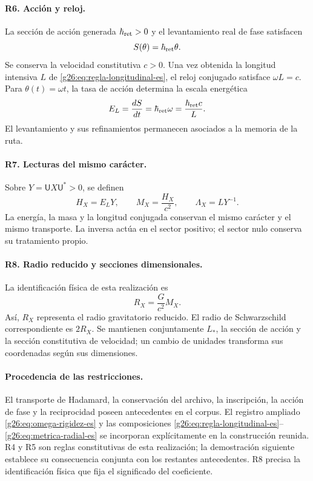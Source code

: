 \paragraph{R6. Acción y reloj.}
La sección de acción generada \(\hbar_{\rm ret}>0\) y el levantamiento
real de fase satisfacen
\begin{equation}
 S(\theta)=\hbar_{\rm ret}\theta.
 \label{g26:eq:accion-fase-es}
\end{equation}
Se conserva la velocidad constitutiva \(c>0\). Una vez obtenida la
longitud intensiva \(L\) de \eqref{g26:eq:regla-longitudinal-es}, el reloj
conjugado satisface \(\omega L=c\). Para \(\theta(t)=\omega t\),
la tasa de acción determina la escala energética
\begin{equation}
 E_{L}=\frac{dS}{dt}=\hbar_{\rm ret}\omega
   =\frac{\hbar_{\rm ret}c}{L}.
 \label{g26:eq:escala-energetica-es}
\end{equation}
El levantamiento y sus refinamientos permanecen asociados a la memoria
de la ruta.

\paragraph{R7. Lecturas del mismo carácter.}
Sobre \(Y=\mathsf U X\mathsf U^*>0\), se definen
\begin{equation}
 H_X=E_{L}Y,\qquad M_X=\frac{H_X}{c^2},\qquad
 \Lambda_X=LY^{-1}.
 \label{g26:eq:lecturas-conjugadas-es}
\end{equation}
La energía, la masa y la longitud conjugada conservan el mismo carácter
y el mismo transporte. La inversa actúa en el sector positivo; el sector
nulo conserva su tratamiento propio.

\paragraph{R8. Radio reducido y secciones dimensionales.}
La identificación física de esta realización es
\begin{equation}
 R_X=\frac{G}{c^2}M_X.
 \label{g26:eq:radio-reducido-es}
\end{equation}
Así, \(R_X\) representa el radio gravitatorio reducido. El radio de
Schwarzschild correspondiente es \(2R_X\). Se mantienen conjuntamente
\(L_*\), la sección de acción y la sección constitutiva de velocidad;
un cambio de unidades transforma sus coordenadas según sus dimensiones.

\paragraph{Procedencia de las restricciones.}
El transporte de Hadamard, la conservación del archivo, la inscripción,
la acción de fase y la reciprocidad poseen antecedentes en el corpus.
El registro ampliado \eqref{g26:eq:omega-rigidez-es} y las composiciones
\eqref{g26:eq:regla-longitudinal-es}--\eqref{g26:eq:metrica-radial-es} se
incorporan explícitamente en la construcción reunida. R4 y R5 son reglas
constitutivas de esta realización; la demostración siguiente establece
su consecuencia conjunta con los restantes antecedentes. R8 precisa
la identificación física que fija el significado del coeficiente.

